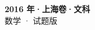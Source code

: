\documentclass[zihao=-4, a4paper]{ctexart}
\begin{document}
\begin{center}
  {\Large\bfseries 2016 年·上海卷·文科}\\[4pt]
  {\large 数学 · 试题版}
\end{center}
\medskip
{}

\end{document}
